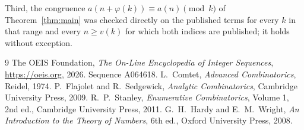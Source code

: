 \documentclass[11pt,a4paper]{article}
\theoremstyle{plain}
\theoremstyle{definition}
\begin{document}
Third, the congruence $a(n+\varphi(k))\equiv a(n)\pmod k$ of Theorem~\ref{thm:main} was
checked directly on the published terms for every $k$ in that range and every $n\ge v(k)$
for which both indices are published; it holds without exception.

\begin{thebibliography}{9}
 The OEIS Foundation, \emph{The On-Line Encyclopedia of Integer
Sequences}, \url{https://oeis.org}, 2026. Sequence A064618.
 L.~Comtet, \emph{Advanced Combinatorics}, Reidel, 1974.
 P.~Flajolet and R.~Sedgewick, \emph{Analytic Combinatorics}, Cambridge
University Press, 2009.
 R.~P.~Stanley, \emph{Enumerative Combinatorics}, Volume 1, 2nd ed.,
Cambridge University Press, 2011.
 G.~H.~Hardy and E.~M.~Wright, \emph{An Introduction to the Theory of
Numbers}, 6th ed., Oxford University Press, 2008.
\end{thebibliography}
\end{document}

